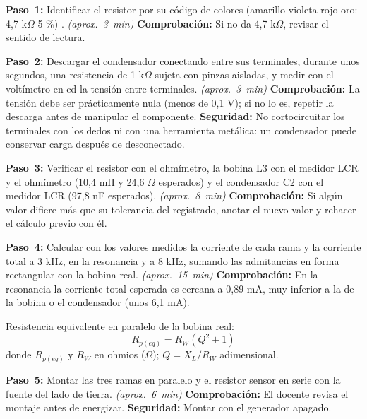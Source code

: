 \documentclass[12pt]{article}
\begin{document}
\begin{pasos}
  \item \textbf{Paso~1:} Identificar el resistor por su código de colores (amarillo-violeta-rojo-oro: 4,7 k\ensuremath{\Omega} \textpm{}5 \%) \cite{ref1}. \emph{(aprox.~\SI{3}{\minute})} \textbf{Comprobación:} Si no da 4,7 k\ensuremath{\Omega}, revisar el sentido de lectura.
  \item \textbf{Paso~2:} Descargar el condensador conectando entre sus terminales, durante unos segundos, una resistencia de 1 k\ensuremath{\Omega} sujeta con pinzas aisladas, y medir con el voltímetro en cd la tensión entre terminales. \emph{(aprox.~\SI{3}{\minute})} \textbf{Comprobación:} La tensión debe ser prácticamente nula (menos de 0,1 V); si no lo es, repetir la descarga antes de manipular el componente. \textbf{Seguridad:} No cortocircuitar los terminales con los dedos ni con una herramienta metálica: un condensador puede conservar carga después de desconectado.
  \item \textbf{Paso~3:} Verificar el resistor con el ohmímetro, la bobina L3 con el medidor LCR y el ohmímetro (10,4 mH y 24,6 \ensuremath{\Omega} esperados) y el condensador C2 con el medidor LCR (97,8 nF esperados). \emph{(aprox.~\SI{8}{\minute})} \textbf{Comprobación:} Si algún valor difiere más que su tolerancia del registrado, anotar el nuevo valor y rehacer el cálculo previo con él.
  \item \textbf{Paso~4:} Calcular con los valores medidos la corriente de cada rama y la corriente total a 3 kHz, en la resonancia y a 8 kHz, sumando las admitancias en forma rectangular con la bobina real. \emph{(aprox.~\SI{15}{\minute})} \textbf{Comprobación:} En la resonancia la corriente total esperada es cercana a 0,89 mA, muy inferior a la de la bobina o el condensador (unos 6,1 mA).
\par Resistencia equivalente en paralelo de la bobina real:
\begin{equation}
  R_{p(eq)} = R_W \left(Q^2 + 1\right)
  \label{eq:paso-4}
\end{equation}
donde $R_{p(eq)}$ y $R_W$ en ohmios (\ensuremath{\Omega}); $Q = X_L / R_W$ adimensional.
  \item \textbf{Paso~5:} Montar las tres ramas en paralelo y el resistor sensor en serie con la fuente del lado de tierra. \emph{(aprox.~\SI{6}{\minute})} \textbf{Comprobación:} El docente revisa el montaje antes de energizar. \textbf{Seguridad:} Montar con el generador apagado.

\end{pasos}
\end{document}
